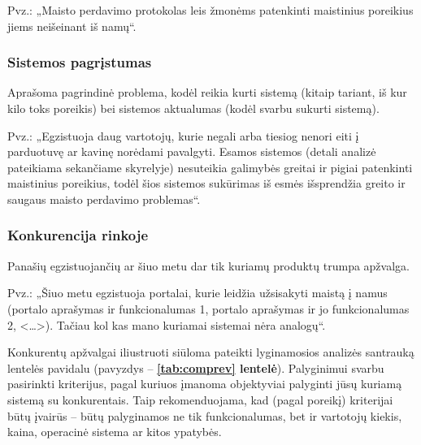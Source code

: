 \documentclass{ktuthesis}
\begin{document}
  Pvz.: „Maisto perdavimo protokolas leis žmonėms patenkinti maistinius poreikius jiems neišeinant iš namų“.

  \subsubsection{Sistemos pagrįstumas}

  Aprašoma pagrindinė problema, kodėl reikia kurti sistemą (kitaip tariant, iš kur kilo toks poreikis) bei sistemos aktualumas (kodėl svarbu sukurti sistemą).

  Pvz.: „Egzistuoja daug vartotojų, kurie negali arba tiesiog nenori eiti į parduotuvę ar kavinę norėdami pavalgyti. Esamos sistemos (detali analizė pateikiama sekančiame skyrelyje) nesuteikia galimybės greitai ir pigiai patenkinti maistinius poreikius, todėl šios sistemos sukūrimas iš esmės išsprendžia greito ir saugaus maisto perdavimo problemas“.

  \subsubsection{Konkurencija rinkoje}

  Panašių egzistuojančių ar šiuo metu dar tik kuriamų produktų trumpa apžvalga.

  Pvz.: „Šiuo metu egzistuoja portalai, kurie leidžia užsisakyti maistą į namus (portalo aprašymas ir funkcionalumas 1, portalo aprašymas ir jo funkcionalumas 2, <\dots>). Tačiau kol kas mano kuriamai sistemai nėra analogų“.

  Konkurentų apžvalgai iliustruoti siūloma pateikti lyginamosios analizės santrauką lentelės pavidalu (pavyzdys – \textbf{\ref{tab:comprev} lentelė}). Palyginimui svarbu pasirinkti kriterijus, pagal kuriuos įmanoma objektyviai palyginti jūsų kuriamą sistemą su konkurentais. Taip rekomenduojama, kad (pagal poreikį) kriterijai būtų įvairūs – būtų palyginamos ne tik funkcionalumas, bet ir vartotojų kiekis, kaina, operacinė sistema ar kitos ypatybės.
\end{document}
